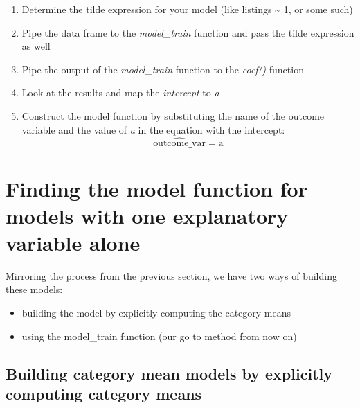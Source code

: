 \documentclass[
  12pt,
  letterpaper,
  DIV=11,
  numbers=noendperiod]{scrreprt}
\providecommand{\tightlist}{%
  \setlength{\itemsep}{0pt}\setlength{\parskip}{0pt}}
\begin{document}
\begin{tcolorbox}[enhanced jigsaw, colback=white, leftrule=.75mm, toprule=.15mm, bottomtitle=1mm, breakable, coltitle=black, toptitle=1mm, title=\textcolor{quarto-callout-tip-color}{\faLightbulb}\hspace{0.5em}{Steps to build the model function for models with no explanatory
variable}, opacitybacktitle=0.6, colbacktitle=quarto-callout-tip-color!10!white, arc=.35mm, left=2mm, colframe=quarto-callout-tip-color-frame, titlerule=0mm, rightrule=.15mm, bottomrule=.15mm, opacityback=0]

\begin{enumerate}
\def\labelenumi{\arabic{enumi}.}
\tightlist
\item
  Determine the tilde expression for your model (like listings
  \textasciitilde{} 1, or some such)
\item
  Pipe the data frame to the \emph{model\_train} function and pass the
  tilde expression as well
\item
  Pipe the output of the \emph{model\_train} function to the
  \emph{coef()} function
\item
  Look at the results and map the \emph{intercept} to \emph{a}
\item
  Construct the model function by substituting the name of the outcome
  variable and the value of \emph{a} in the equation with the intercept:
  \[
  \widehat{\text{outcome\_var}} = \text{a}
  \]
\end{enumerate}

\end{tcolorbox}

\section{Finding the model function for models with one explanatory
variable
alone}\label{finding-the-model-function-for-models-with-one-explanatory-variable-alone}

Mirroring the process from the previous section, we have two ways of
building these models:

\begin{itemize}
\tightlist
\item
  building the model by explicitly computing the category means
\item
  using the model\_train function (our go to method from now on)
\end{itemize}

\subsection{Building category mean models by explicitly computing
category
means}\label{building-category-mean-models-by-explicitly-computing-category-means}
\end{document}
